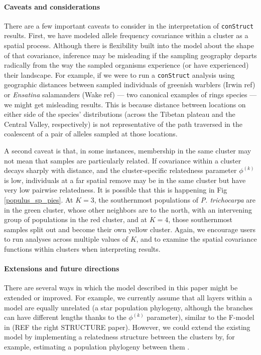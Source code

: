 \documentclass[12pt]{article}
\newcommand{\gb}[1]{{\it\color{magenta}{(#1)}}}
\begin{document}
\paragraph{Caveats and considerations}
There are a few important caveats to consider in the interpretation of \texttt{conStruct} results. 
First, we have modeled allele frequency covariance within a cluster as a spatial process.
Although there is flexibility built into the model about the shape of that covariance, 
inference may be misleading if the sampling geography departs radically from the way 
the sampled organisms experience (or have experienced) their landscape.
For example, if we were to run a \texttt{conStruct} analysis using geographic distances between 
sampled individuals of greenish warblers (Irwin ref) or \textit{Ensatina} salamanders (Wake ref)
--- two canonical examples of rings species --- 
we might get misleading results.
This is because distance between locations on either side of the species' distributions
(across the Tibetan plateau and the Central Valley, respectively) 
is not representative of the path traversed in the coalescent of a pair of alleles sampled at those locations.

A second caveat is that, in some instances, 
membership in the same cluster may not mean that samples are particularly related.
If covariance within a cluster decays sharply with distance, 
and the cluster-specific relatedness parameter $\phi^{(k)}$ is low, 
individuals at a far spatial remove may be in the same cluster but have very low pairwise relatedness.
It is possible that this is happening in Fig \ref{populus_sp_pies}. 
At $K=3$, the southernmost populations of \textit{P. trichocarpa} are in the green cluster, 
whose other neighbors are to the north, with an intervening group of populations in the red cluster, 
and at $K=4$, those southernmost samples split out and become their own yellow cluster.
Again, we encourage users to run analyses across multiple values of $K$, 
and to examine the spatial covariance functions within clusters when interpreting results.
\gb{missing data?}

\paragraph{Extensions and future directions}
There are several ways in which the model described in this paper might be extended or improved.  
For example, we currently assume that all layers within a model are equally unrelated 
(a star population phylogeny, although the branches can have different lengths thanks to the $\phi^{(k)}$ parameter), 
similar to the F-model in (REF the right STRUCTURE paper).
However, we could extend the existing model by implementing 
a relatedness structure between the clusters by, for example, 
estimating a population phylogeny between them \citep[e.g.][]{treemix}.
\end{document}
